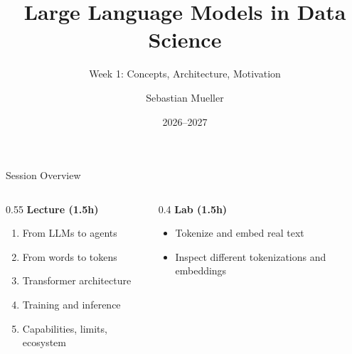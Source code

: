 \documentclass[aspectratio=169]{beamer}
\title{Large Language Models in Data Science}
\subtitle{Week 1: Concepts, Architecture, Motivation}
\author{Sebastian Mueller}
\institute{Aix-Marseille Universit\'e}
\date{2026--2027}
\begin{document}
\begin{frame}[plain]
  \titlepage
\end{frame}

\begin{frame}{Session Overview}
  \begin{columns}[T,onlytextwidth]
    \begin{column}{0.55\linewidth}
      \textbf{Lecture (1.5h)}
      \begin{enumerate}
        \item From LLMs to agents
        \item From words to tokens
        \item Transformer architecture
        \item Training and inference
        \item Capabilities, limits, ecosystem
      \end{enumerate}
    \end{column}
    \begin{column}{0.4\linewidth}
      \textbf{Lab (1.5h)}
      \begin{itemize}
        \item Tokenize and embed real text
        \item Inspect different tokenizations and embeddings
      \end{itemize}
    \end{column}
  \end{columns}
\end{frame}
\end{document}

